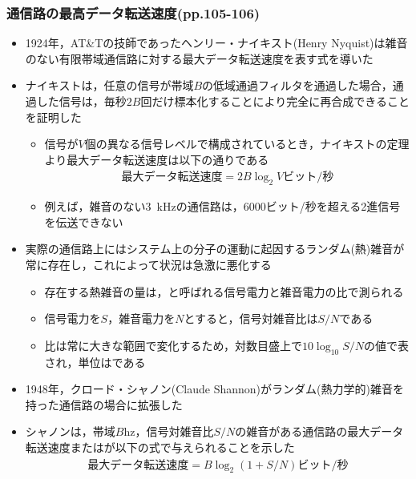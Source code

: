 \documentclass[a4paper]{ltjsarticle}
\begin{document}
    \subsubsection{通信路の最高データ転送速度(pp.105-106)}
      \begin{itemize}
        \item 1924年，AT\&Tの技師であったヘンリー・ナイキスト(Henry Nyquist)は雑音のない有限帯域通信路に対する最大データ転送速度を表す式を導いた
        \item ナイキストは，任意の信号が帯域$B$の低域通過フィルタを通過した場合，通過した信号は，毎秒$2B$回だけ標本化することにより完全に再合成できることを証明した
        \begin{itemize}
          \item 信号が$V$個の異なる信号レベルで構成されているとき，ナイキストの定理より最大データ転送速度は以下の通りである
            \begin{align}
              \text{最大データ転送速度} = 2B \log_2 V \text{ビット/秒}
            \end{align}
          \item 例えば，雑音のない\SI{3}{kHz}の通信路は，6000ビット/秒を超える2進信号を伝送できない
        \end{itemize}
        \item 実際の通信路上にはシステム上の分子の運動に起因するランダム(熱)雑音が常に存在し，これによって状況は急激に悪化する
        \begin{itemize}
          \item 存在する熱雑音の量は，と呼ばれる信号電力と雑音電力の比で測られる
          \item 信号電力を$S$，雑音電力を$N$とすると，信号対雑音比は$S/N$である
          \item 比は常に大きな範囲で変化するため，対数目盛上で$10 \log_{10} S/N$の値で表され，単位はである
				\end{itemize}
				\newpage
        \item 1948年，クロード・シャノン(Claude Shannon)がランダム(熱力学的)雑音を持った通信路の場合に拡張した				
        \item シャノンは，帯域$B$\si{hz}，信号対雑音比$S/N$の雑音がある通信路の最大データ転送速度またはが以下の式で与えられることを示した
          \begin{align}
            \text{最大データ転送速度} = B \log_2 (1+S/N) \text{ビット/秒}
          \end{align}
      \end{itemize}
\end{document}
